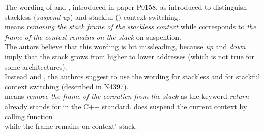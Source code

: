 The wording of \susup and \susdown, introduced in paper P0158\cite{P0158}, as
introduced to distinguish stackless (\emph{suspend-up}) and stackful (\susdown)
context switching.\\
\susup means \emph{removing the stack frame of the stackless context} while
\susdown corresponds to \emph{the frame of the context remains on the stack} on
suspention.\\
The autors believe that this wording is bit missleading, because \emph{up} and
\emph{down} imply that the stack grows from higher to lower addresses (which is
not true for some architectures).\\
\newline
Instead \susup and \susdown, the authros suggest to use the wording \susreturn
for stackless and \suscall for stackful context switching (described in
N4397\cite{N4397}).\\
\susreturn means \emph{remove the frame of the coroutien from the stack} as the
keyword \emph{return} already stands for in the C++ standard. \suscall does
suspend the current context by calling function\\
 while the frame remains on
context' stack.
